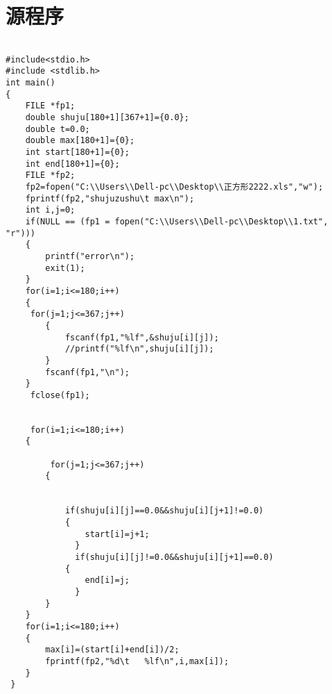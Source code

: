 
\chapter*{源程序}
\lstset{language=C}
\begin{lstlisting}

#include<stdio.h>
#include <stdlib.h>
int main()
{
	FILE *fp1;
	double shuju[180+1][367+1]={0.0};
	double t=0.0;
	double max[180+1]={0};
	int start[180+1]={0};
	int end[180+1]={0};
	FILE *fp2;
	fp2=fopen("C:\\Users\\Dell-pc\\Desktop\\正方形2222.xls","w");
	fprintf(fp2,"shujuzushu\t max\n");
	int i,j=0;
	if(NULL == (fp1 = fopen("C:\\Users\\Dell-pc\\Desktop\\1.txt", "r")))  
    {  
        printf("error\n");  
        exit(1);  
    }
    for(i=1;i<=180;i++)
	{
	 for(j=1;j<=367;j++)
		{
			fscanf(fp1,"%lf",&shuju[i][j]);
			//printf("%lf\n",shuju[i][j]);
		}
		fscanf(fp1,"\n");
	}
	 fclose(fp1);
	
	
	 for(i=1;i<=180;i++)
	{
	
		 for(j=1;j<=367;j++)
		{
			
			
			if(shuju[i][j]==0.0&&shuju[i][j+1]!=0.0)
			{
				start[i]=j+1;
			  }
			  if(shuju[i][j]!=0.0&&shuju[i][j+1]==0.0)
			{
				end[i]=j;
			  }
		}
	}
	for(i=1;i<=180;i++)
	{
		max[i]=(start[i]+end[i])/2;
		fprintf(fp2,"%d\t   %lf\n",i,max[i]);
	}
 }
\end{lstlisting}